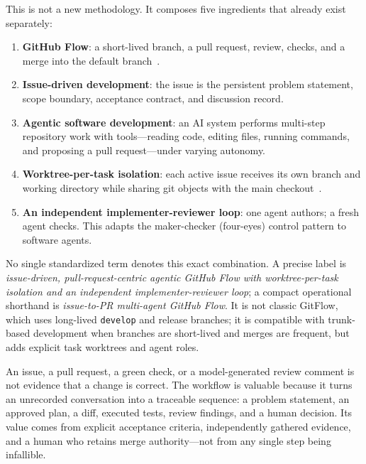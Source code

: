 \documentclass[11pt]{article}
\newcommand{\co}[1]{\lstinline[basicstyle=\ttfamily\color{gwInk}]{#1}}
\begin{document}
This is not a new methodology. It composes five ingredients that already exist separately:

\begin{enumerate}
  \item \textbf{GitHub Flow}: a short-lived branch, a pull request, review, checks, and a merge
    into the default branch~\cite{github2026flow,github2026prs}.
  \item \textbf{Issue-driven development}: the issue is the persistent problem statement, scope
    boundary, acceptance contract, and discussion record.
  \item \textbf{Agentic software development}: an AI system performs multi-step repository work
    with tools---reading code, editing files, running commands, and proposing a pull request---under
    varying autonomy.
  \item \textbf{Worktree-per-task isolation}: each active issue receives its own branch and
    working directory while sharing git objects with the main checkout~\cite{git2026worktree}.
  \item \textbf{An independent implementer-reviewer loop}: one agent authors; a fresh agent
    checks. This adapts the maker-checker (four-eyes) control pattern to software agents.
\end{enumerate}

No single standardized term denotes this exact combination. A precise label is
\emph{issue-driven, pull-request-centric agentic GitHub Flow with worktree-per-task isolation and
an independent implementer-reviewer loop}; a compact operational shorthand is
\emph{issue-to-PR multi-agent GitHub Flow}. It is not classic GitFlow, which uses long-lived
\co{develop} and release branches; it is compatible with trunk-based development when branches are
short-lived and merges are frequent, but adds explicit task worktrees and agent roles.

\begin{keyidea}
An issue, a pull request, a green check, or a model-generated review comment is not evidence that
a change is correct. The workflow is valuable because it turns an unrecorded conversation into a
traceable sequence: a problem statement, an approved plan, a diff, executed tests, review
findings, and a human decision. Its value comes from explicit acceptance criteria, independently
gathered evidence, and a human who retains merge authority---not from any single step being
infallible.
\end{keyidea}
\end{document}
